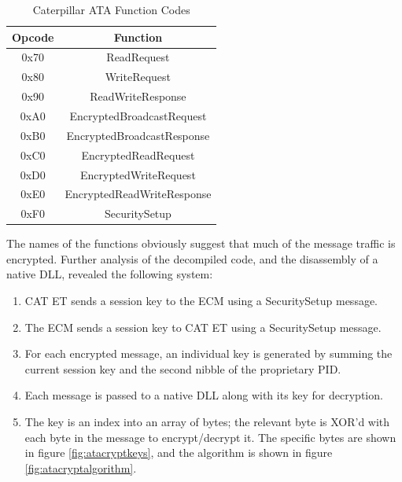 \begin{table}[h]
  \centering
   \begin{tabular}{|c|c|}
    \hline
    Opcode & Function \\
    \hline
    0x70 & ReadRequest \\
    \hline
    0x80 & WriteRequest \\
    \hline
    0x90 & ReadWriteResponse\\
    \hline
    0xA0 & EncryptedBroadcastRequest\\
    \hline
    0xB0 & EncryptedBroadcastResponse\\
    \hline
    0xC0 & EncryptedReadRequest\\
    \hline
    0xD0 & EncryptedWriteRequest\\
    \hline
    0xE0 & EncryptedReadWriteResponse\\
    \hline
    0xF0 & SecuritySetup\\
    \hline
   \end{tabular}

\caption{Caterpillar ATA Function Codes}
\label{tab:catet}
\end{table}

The names of the functions obviously suggest that much of the message traffic is encrypted. Further analysis of the
decompiled code, and the disassembly of a native DLL, revealed the following system:

\begin{enumerate}
  \item CAT ET sends a session key to the ECM using a SecuritySetup message.
  \item The ECM sends a session key to CAT ET using a SecuritySetup message.
  \item For each encrypted message, an individual key is generated by summing the
        current session key and the second nibble of the proprietary PID.
  \item Each message is passed to a native DLL along with its key for decryption.
  \item The key is an index into an array of bytes; the relevant byte is XOR'd
        with each byte in the message to encrypt/decrypt it. The specific bytes are
        shown in figure \ref{fig:atacryptkeys}, and the algorithm is shown in
        figure \ref{fig:atacryptalgorithm}.
\end{enumerate}


